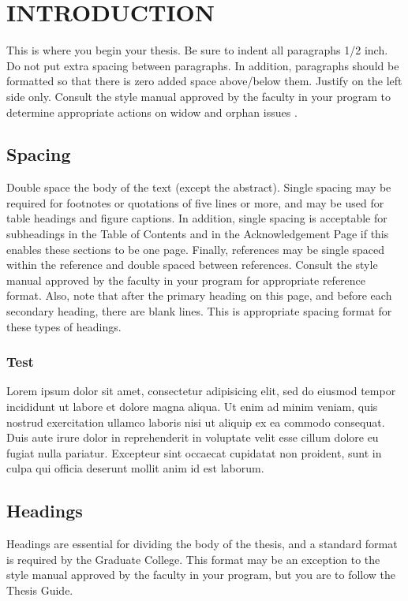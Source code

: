 \doublespacing

\chapter{INTRODUCTION}
This is where you begin your thesis. Be sure to indent all paragraphs 1/2 inch. Do not put extra spacing between paragraphs. In addition, paragraphs should be formatted so that there is zero added space above/below them. Justify on the left side only. Consult the style manual approved by the faculty in your program to determine appropriate actions on widow and orphan issues \cite{article-minimal}.

\section{Spacing}
Double space the body of the text (except the abstract). Single spacing may be required for footnotes or quotations of five lines or more, and may be used for table headings and figure captions. In addition, single spacing is acceptable for subheadings in the Table of Contents and in the Acknowledgement Page if this enables these sections to be one page. Finally, references may be single spaced within the reference and double spaced between references. Consult the style manual approved by the faculty in your program for appropriate reference format. Also, note that after the primary heading on this page, and before each secondary heading, there are blank lines. This is appropriate spacing format for these types of headings.

\subsection{Test}
Lorem ipsum dolor sit amet, consectetur adipisicing elit, sed do eiusmod
tempor incididunt ut labore et dolore magna aliqua. Ut enim ad minim veniam,
quis nostrud exercitation ullamco laboris nisi ut aliquip ex ea commodo
consequat. Duis aute irure dolor in reprehenderit in voluptate velit esse
cillum dolore eu fugiat nulla pariatur. Excepteur sint occaecat cupidatat non
proident, sunt in culpa qui officia deserunt mollit anim id est laborum.

\section{Headings}
Headings are essential for dividing the body of the thesis, and a standard format is required by the Graduate College. This format may be an exception to the style manual approved by the faculty in your program, but you are to follow the Thesis Guide.

